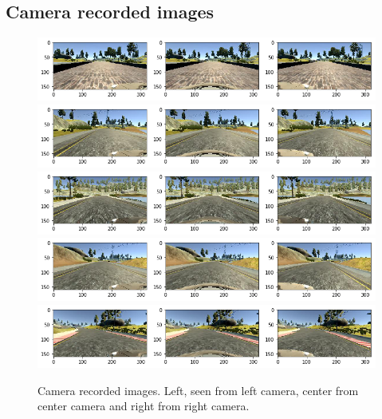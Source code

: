 \documentclass[12pt,a4paper]{article}
\begin{document}
	\subsection{Camera recorded images}
	\begin{figure}[H]
		\centering
		\includegraphics[width=0.9\linewidth]{writeup_figures/three_cameras_1}
		\includegraphics[width=0.9\linewidth]{writeup_figures/three_cameras_2}
		\includegraphics[width=0.9\linewidth]{writeup_figures/three_cameras_3}
		\includegraphics[width=0.9\linewidth]{writeup_figures/three_cameras_4}
		\includegraphics[width=0.9\linewidth]{writeup_figures/three_cameras_5}
		\caption{Camera recorded images. Left, seen from left camera, center from center camera and right from right camera.}
		\label{fig:threecameras}
	\end{figure}
\end{document}
